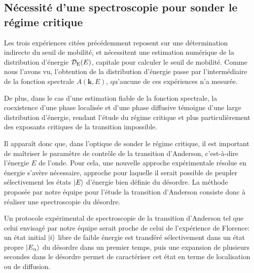 \subsection{Nécessité d'une spectroscopie pour sonder le régime critique}
\label{sc:spectroscopie_transition}
Les trois expériences citées précédemment reposent sur une détermination indirecte du seuil de mobilité, et nécessitent une estimation numérique de la distribution d'énergie $\mathcal{D}_{\mathrm{E}}(E)$, capitale pour calculer le seuil de mobilité. Comme nous l'avons vu, l'obtention de la distribution d'énergie passe par l'intermédiaire de la fonction spectrale $A(\mathbf{k},E)$, qu'aucune de ces expériences n'a mesurée. 

De plus, dans le cas d'une estimation fiable de la fonction spectrale, la coexistence d'une phase localisée et d'une phase diffusive témoigne d'une large distribution d'énergie, rendant l'étude du régime critique et plus particulièrement des exposants critiques de la transition impossible.

Il apparaît donc que, dans l'optique de sonder le régime critique, il est important de maîtriser le paramètre de contrôle de la transition d'Anderson, c'est-à-dire l'énergie $E$ de l'onde. Pour cela, une nouvelle approche expérimentale résolue en énergie s'avère nécessaire, approche pour laquelle il serait possible de peupler sélectivement les états $\left| E \right\rangle$ d'énergie bien définie du désordre. La méthode proposée par notre équipe pour l'étude la transition d'Anderson consiste donc à réaliser une spectroscopie du désordre.





Un protocole expérimental de spectroscopie de la transition d'Anderson tel que celui envisagé par notre équipe serait proche de celui de l'expérience de Florence: un état initial $\left| i \right\rangle$ libre de faible énergie est transféré sélectivement dans un état propre $\left| E_\alpha \right\rangle$ du désordre dans un premier temps, puis une expansion de plusieurs secondes dans le désordre permet de caractériser cet état en terme de localisation ou de diffusion. 




